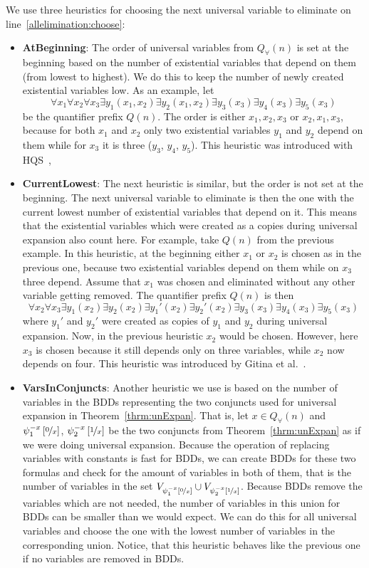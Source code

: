 \documentclass[
  digital, %
  color,
  twoside, %
  table,   %
  nolof,     %
  nolot,     %
]{fithesis3}
\theoremstyle{definition}
\theoremstyle{remark}
\newcommand{\substitute}[2]{\left[ \nicefrac{#2}{#1} \right]}
\newcommand{\vars}[1]{V_{#1}}
\newcommand{\prefix}[1]{Q({#1})}
\newcommand{\uprefix}[1]{Q_{\forall}(#1)}
\newcommand{\QUatbeginning}{\textbf{AtBeginning}}
\newcommand{\QUcurrentlowest}{\textbf{CurrentLowest}}
\newcommand{\QUvarsinconjuncts}{\textbf{VarsInConjuncts}}
\begin{document}
We use three heuristics for choosing the next universal variable to eliminate on line~\ref{allelimination:choose}:
\begin{itemize}
    \item \QUatbeginning{}: The order of universal variables from $\uprefix{n}$ is set at the beginning based on the number of existential variables that depend on them (from lowest to highest). We do this to keep the number of newly created existential variables low. %
    As an example, let
    \[\forall x_1 \forall x_2 \forall x_3 \exists y_1(x_1, x_2) \exists y_2(x_1,x_2) \exists y_3(x_3) \exists y_4(x_3) \exists y_5 (x_3)\]
    be the quantifier prefix $\prefix{n}$. The order is either $x_1, x_2, x_3$ or $x_2, x_1, x_3$, because for both $x_1$ and $x_2$ only two existential variables $y_1$ and $y_2$ depend on them while for $x_3$ it is three ($y_3$, $y_4$, $y_5$). This heuristic was introduced with HQS~\cite{HQSquantifierElimination}, 
    \item \QUcurrentlowest{}: The next heuristic is similar, but the order is not set at the beginning. The next universal variable to eliminate is then the one with the current lowest number of existential variables that depend on it. This means that the existential variables which were created as a copies during universal expansion also count here. For example, take $\prefix{n}$ from the previous example. In this heuristic, at the beginning either $x_1$ or $x_2$ is chosen as in the previous one, because two existential variables depend on them while on $x_3$ three depend. Assume that $x_1$ was chosen and eliminated without any other variable getting removed. The quantifier prefix $\prefix{n}$ is then
    \[\forall x_2 \forall x_3 \exists y_1(x_2) \exists y_2(x_2) \exists y_1'(x_2) \exists y_2'(x_2) \exists y_3(x_3) \exists y_4(x_3) \exists y_5 (x_3)\]
    where $y_1'$ and $y_2'$ were created as copies of $y_1$ and $y_2$ during universal expansion. Now, in the previous heuristic $x_2$ would be chosen. However, here $x_3$ is chosen because it still depends only on three variables, while $x_2$ now depends on four. This heuristic was introduced by Gitina et al.~\cite{HQSsimpleAlg}.
    \item \QUvarsinconjuncts{}: Another heuristic we use is based on the number of variables in the BDDs representing the two conjuncts used for universal expansion in Theorem~\ref{thrm:unExpan}. That is, let $x \in \uprefix{n}$ and $\psi_1^{-x}\substitute{x}{0}$, $\psi_2^{-x}\substitute{x}{1}$
    be the two conjuncts from Theorem~\ref{thrm:unExpan} as if we were doing universal expansion. Because the operation of replacing variables with constants is fast for BDDs, we can create BDDs for these two formulas and check for the amount of variables in both of them, that is the number of variables in the set $\vars{\psi_1^{-x}\substitute{x}{0}} \cup \vars{\psi_2^{-x}\substitute{x}{1}}$. Because BDDs remove the variables which are not needed, the number of variables in this union for BDDs can be smaller than we would expect. We can do this for all universal variables and choose the one with the lowest number of variables in the corresponding union. Notice, that this heuristic behaves like the previous one if no variables are removed in BDDs.

\end{itemize}
\end{document}
